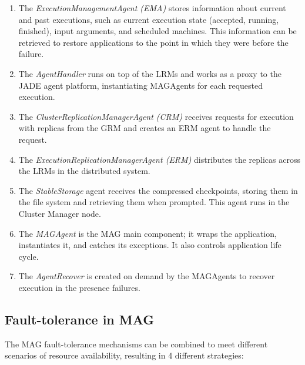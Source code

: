 \documentclass{sig-alternate}
\begin{document}
\begin{enumerate}

    \item The \emph{ExecutionManagementAgent (EMA)}  stores
    information about current and past executions, such as current execution state
    (accepted, running, finished), input arguments, and scheduled machines. This information
    can be retrieved to restore applications to the point in which they were before
    the failure.

    \item The \emph{AgentHandler} runs on top of the LRMs and 
    works as a proxy to the JADE agent platform, instantiating
    MAGAgents for each requested execution.

    \item The \emph{ClusterReplicationManagerAgent (CRM)} receives requests
    for execution with replicas from the GRM and creates an ERM agent to handle the request.

    \item The \emph{ExecutionReplicationManagerAgent (ERM)} distributes the replicas across the 
    LRMs in the distributed system.

    \item The \emph{StableStorage} agent receives the compressed
    checkpoints, storing them in the file system and retrieving them when
    prompted. This agent runs in the Cluster Manager node.

    \item The \emph{MAGAgent} is the MAG main component; it
    wraps the application, instantiates it, and catches its exceptions. It also controls application 
    life cycle.

    \item The \emph{AgentRecover} is created on demand by the MAGAgents  to recover
    execution in the presence failures.

\end{enumerate}

\subsection{Fault-tolerance in MAG\label{sec:faulttolerance}}

The MAG fault-tolerance mechanisms can be combined to meet different scenarios of resource
availability, resulting in 4 different strategies:
\end{document}
